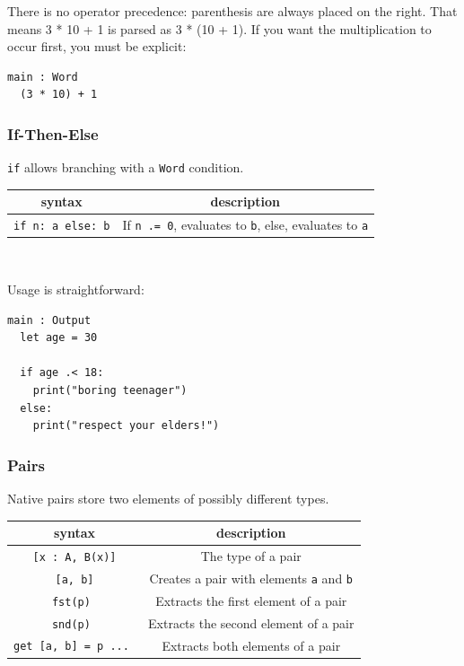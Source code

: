 \documentclass{article}
\theoremstyle{definition}
\theoremstyle{theorem}
\begin{document}
There is no operator precedence: parenthesis are always placed on the right.
That means 3 * 10 + 1 is parsed as 3 * (10 + 1). If you want the multiplication
to occur first, you must be explicit:

\begin{lstlisting}
main : Word
  (3 * 10) + 1
\end{lstlisting}

\subsubsection{If-Then-Else}

\verb|if| allows branching with a \verb|Word| condition.

\hfill \newline
\begin{tabular}{ c | c }
syntax & description \\\hline
\verb|if n: a else: b| & If \verb|n .= 0|, evaluates to \verb|b|, else, evaluates to \verb|a|
\end{tabular}
\\ \hfill \newline

Usage is straightforward:

\begin{lstlisting}
main : Output
  let age = 30

  if age .< 18:
    print("boring teenager")
  else:
    print("respect your elders!")
\end{lstlisting}

\subsubsection{Pairs}

Native pairs store two elements of possibly different types.

\hfill \newline
\begin{tabular}{ c | c }
syntax & description \\\hline
\verb|[x : A, B(x)]| & The type of a pair\\
\verb|[a, b]| & Creates a pair with elements \verb|a| and \verb|b|\\
\verb|fst(p) | & Extracts the first element of a pair\\
\verb|snd(p) | & Extracts the second element of a pair\\
\verb|get [a, b] = p ... | &Extracts both elements of a pair\\
\end{tabular}
\\ \hfill \newline
\end{document}

